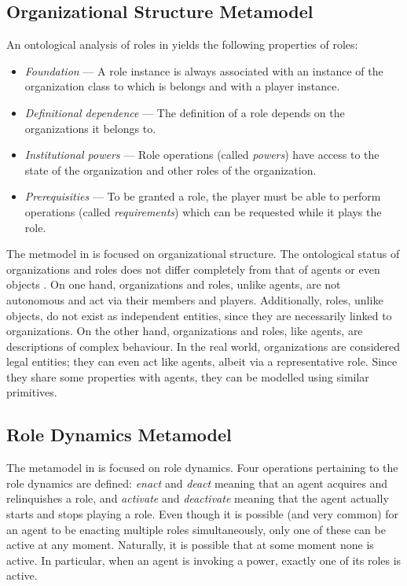 \subsection*{Organizational Structure Metamodel}

An ontological analysis of roles in \cite{Boella04} yields the following properties of roles:
\begin{itemize}
	\item \textit{Foundation} --- A role instance is always associated with an instance of the organization class to which is belongs and with a player instance.
	\item \textit{Definitional dependence} --- The definition of a role depends on the organizations it belongs to.
	\item \textit{Institutional powers} --- Role operations (called \textit{powers}) have access to the state of the organization and other roles of the organization.
	\item \textit{Prerequisities} --- To be granted a role, the player must be able to perform operations (called \textit{requirements}) which can be requested while it plays the role.
\end{itemize}


The metmodel in \cite{Boella04} is focused on organizational structure.
The ontological status of organizations and roles does not differ completely from that of agents or even objects \cite{Boella04}.
On one hand, organizations and roles, unlike agents, are not autonomous and act via their members and players.
Additionally, roles, unlike objects, do not exist as independent entities, since they are necessarily linked to organizations.
On the other hand, organizations and roles, like agents, are descriptions of complex behaviour.
In the real world, organizations are considered legal entities; they can even act like agents, albeit via a representative role.
Since they share some properties with agents, they can be modelled using similar primitives.

\subsection*{Role Dynamics Metamodel}

The metamodel in \cite{Dastani04} is focused on role dynamics.
Four operations pertaining to the role dynamics are defined: \textit{enact} and \textit{deact} meaning that an agent acquires and relinquishes a role, and \textit{activate} and \textit{deactivate} meaning that the agent actually starts and stops playing a role.
Even though it is possible (and very common) for an agent to be enacting multiple roles simultaneously, only one of these can be active at any moment.
Naturally, it is possible that at some moment none is active.
In particular, when an agent is invoking a power, exactly one of its roles is active.

